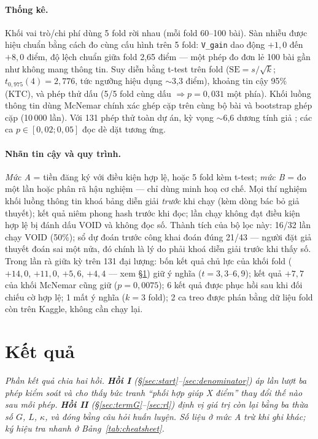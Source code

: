 \documentclass[11pt,a4paper]{article}
\begin{document}
\paragraph{Thống kê.} Khối vai trò/chi phí dùng 5 fold rời nhau (mỗi fold 60--100 bài). Sàn
nhiễu được hiệu chuẩn bằng cách đo cùng cấu hình trên 5 fold: \texttt{V\_gain} dao động
$+1{,}0$ đến $+8{,}0$ điểm, độ lệch chuẩn giữa fold 2,65 điểm --- một phép đo đơn lẻ 100 bài
gần như không mang thông tin. Suy diễn bằng t-test trên fold ($\mathrm{SE}=s/\sqrt{k}$;
$t_{0{,}975}(4)=2{,}776$, tức ngưỡng hiệu dụng $\sim$3,3 điểm), khoảng tin cậy 95\% (KTC), và
phép thử dấu (5/5 fold cùng dấu $\Rightarrow p=0{,}031$ một phía). Khối luồng thông tin dùng
McNemar chính xác ghép cặp trên cùng bộ bài và bootstrap ghép cặp (10\,000 lần). Với 131 phép
thử toàn dự án, kỳ vọng $\sim$6,6 dương tính giả \cite{bh1995}; các ca $p \in [0{,}02;0{,}05]$
đọc dè dặt tương ứng.

\paragraph{Nhãn tin cậy và quy trình.} \emph{Mức A} = tiền đăng ký với điều kiện hợp lệ, hoặc 5
fold kèm t-test; \emph{mức B} = đo một lần hoặc phân rã hậu nghiệm --- chỉ dùng minh hoạ cơ
chế. Mọi thí nghiệm khối luồng thông tin khoá bảng diễn giải \emph{trước} khi chạy (kèm dòng
bác bỏ giả thuyết); kết quả niêm phong hash trước khi đọc; lần chạy không đạt điều kiện hợp lệ
bị đánh dấu VOID và không đọc số. Thành tích của bộ lọc này: 16/32 lần chạy VOID (50\%); sổ dự
đoán trước công khai đoán đúng 21/43 --- người đặt giả thuyết đoán sai một nửa, đó chính là lý
do phải khoá diễn giải trước khi thấy số. Trong lần rà giữa kỳ trên 131 đại lượng: bốn kết quả
chủ lực của khối fold ($+14{,}0$, $+11{,}0$, $+5{,}6$, $+4{,}4$ --- xem \S\ref{sec:results})
giữ ý nghĩa ($t=3{,}3$--$6{,}9$); kết quả $+7{,}7$ của khối McNemar cũng giữ ($p=0{,}0075$);
6 kết quả được phục hồi sau khi đối chiếu cờ hợp lệ; 1 mất ý nghĩa ($k{=}3$ fold); 2 ca treo
được phán bằng dữ liệu fold còn trên Kaggle, không cần chạy lại.

\section{Kết quả}\label{sec:results}

\emph{Phần kết quả chia hai hồi. \textbf{Hồi I} (\S\ref{sec:start}--\ref{sec:denominator}) áp
lần lượt ba phép kiểm soát và cho thấy bức tranh ``phối hợp giúp X điểm'' thay đổi thế nào sau
mỗi phép. \textbf{Hồi II} (\S\ref{sec:termG}--\ref{sec:rl}) định vị giá trị còn lại bằng ba
thừa số $G$, $L$, $\kappa$, và đóng bằng câu hỏi huấn luyện. Số liệu ở mức A trừ khi ghi khác;
ký hiệu tra nhanh ở Bảng~\ref{tab:cheatsheet}.}
\end{document}
